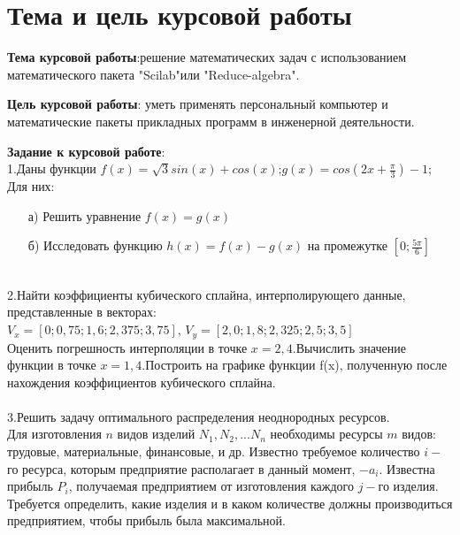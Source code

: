 \documentclass[russian,utf8,nocolumnxxxi,nocolumnxxxii]{eskdtext}
\begin{document}
\maketitle

\newpage
\tableofcontents

\newpage


\newpage
\section{Тема и цель курсовой работы}
\textbf{Тема курсовой работы}:решение математических задач с использованием математического пакета "Scilab"или "Reduce-algebra".

\textbf{Цель курсовой работы}: уметь применять персональный компьютер и математические пакеты прикладных программ в инженерной деятельности.


\textbf{Задание к курсовой работе}:
\\1.Даны функции $f(x)=\sqrt{3}sin(x)+cos(x)$;$g(x)=cos(2x+\frac{\pi}{3})-1$;
\\Для них:
\begin{enumerate}
    \item[а)]Решить уравнение $f(x)=g(x)$
    \item[б)]Исследовать функцию $h(x)=f(x)-g(x)$ на промежутке $[0;\frac{5\pi}{6}]$
\end{enumerate}

\\2.Найти коэффициенты кубического сплайна, интерполирующего данные, представленные в векторах:\\
$V_{x}=[0;0,75;1,6;2,375;3,75]$,
$V_{y}=[2,0;1,8;2,325;2,5;3,5]$\\
Оценить погрешность интерполяции в точке $x=2,4$.Вычислить значение функции в точке $x=1,4$.Построить на графике функции f(x), полученную после нахождения коэффициентов кубического сплайна.\\
\\3.Решить задачу оптимального распределения неоднородных ресурсов.\\
Для изготовления $n$ видов изделий $N_1,N_2,...N_n$ необходимы ресурсы $m$ видов: трудовые, материальные, финансовые, и др. Известно требуемое количество $i-$го ресурса, которым предприятие располагает в данный момент, $-a_i$. Известна прибыль $P_i$, получаемая предприятием от изготовления каждого $j-$го изделия. Требуется определить, какие изделия и в каком количестве должны производиться предприятием, чтобы прибыль была максимальной.
\end{document}
